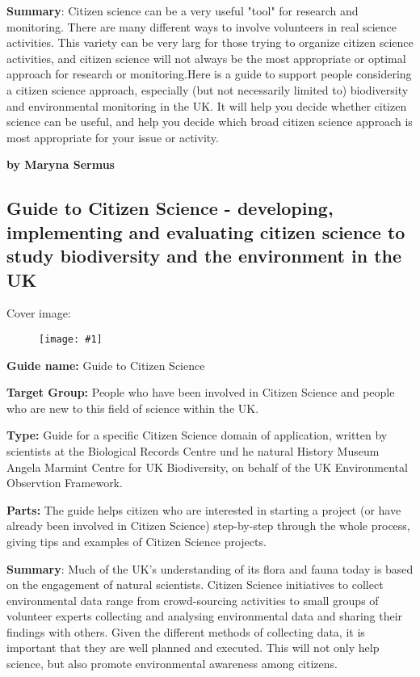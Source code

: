 \documentclass{article}
\newlength{\imgwidth}
\newcommand\scaledgraphics[2]{%
                
\settowidth{\imgwidth}{\texttt{[image: \#1]}}%
                
\setlength{\imgwidth}{\minof{\imgwidth}{#2\textwidth}}%
                
\texttt{[image: \#1]}%
                
}
\begin{document}
\textbf{Summary}: Citizen science can be a very useful "tool" for research and monitoring. There are many different ways to involve volunteers in real science activities. This variety can be very larg for those trying to organize citizen science activities, and citizen science will not always be the most appropriate or optimal approach for research or monitoring.Here is a guide to support people considering a citizen science approach, especially (but not necessarily limited to) biodiversity and environmental monitoring in the UK. It will help you decide whether citizen science can be useful, and help you decide which broad citizen science approach is most appropriate for your issue or activity. 


\textbf{by Maryna Sermus}


\subsection{Guide to Citizen Science - developing, implementing and evaluating citizen science to study biodiversity and the environment in the UK}\label{H3514415}



Cover image: 

\begin{figure}
\scaledgraphics{bfcdb806-4a62-40b9-92f8-a4b78de8ea77.png}{0.5}
\label{F60825051}
\end{figure}


\textbf{Guide name: }Guide to Citizen Science\textbf{ } \autocite{tweddle_guide_2012}


\textbf{Target Group: }People who have been involved in Citizen Science and people who are new to this field of science within the UK.


\textbf{Type: }Guide for a specific Citizen Science domain of application, written by scientists at the Biological Records Centre und he natural History Museum Angela Marmint Centre for UK Biodiversity, on behalf of the UK Environmental Observtion Framework.


\textbf{Parts: }The guide helps citizen who are interested in starting a project (or have already been involved in Citizen Science) step-by-step through the whole process, giving tips and examples of Citizen Science projects.


\textbf{Summary}: Much of the UK's understanding of its flora and fauna today is based on the engagement of natural scientists. Citizen Science initiatives to collect environmental data range from crowd-sourcing activities to small groups of volunteer experts collecting and analysing environmental data and sharing their findings with others. Given the different methods of collecting data, it is important that they are well planned and executed. This will not only help science, but also promote environmental awareness among citizens.
\end{document}
